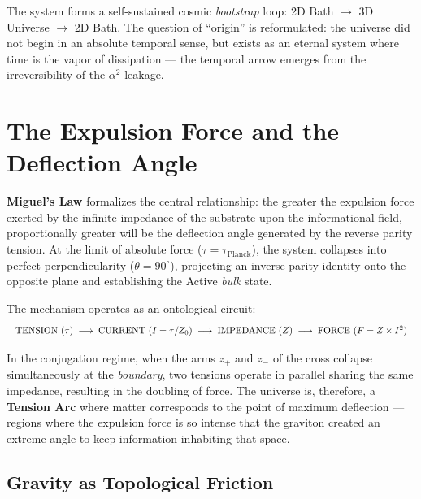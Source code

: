 \documentclass[12pt,a4paper,twoside]{article}
\newcommand{\alphaii}{\alpha^{2}}
\newcommand{\boundary}{\textit{boundary}}
\newcommand{\bulk}{\textit{bulk}}
\begin{document}
The system forms a self-sustained cosmic \textit{bootstrap} loop: 2D Bath $\to$ 3D Universe $\to$ 2D Bath. The question of ``origin'' is reformulated: the universe did not begin in an absolute temporal sense, but exists as an eternal system where time is the vapor of dissipation --- the temporal arrow emerges from the irreversibility of the $\alphaii$ leakage.


\section{The Expulsion Force and the Deflection Angle}


\textbf{Miguel's Law} formalizes the central relationship: the greater the expulsion force exerted by the infinite impedance of the substrate upon the informational field, proportionally greater will be the deflection angle generated by the reverse parity tension. At the limit of absolute force ($\tau = \tau_{\text{Planck}}$), the system collapses into perfect perpendicularity ($\theta = 90^\circ{}$), projecting an inverse parity identity onto the opposite plane and establishing the Active \bulk{} state.

The mechanism operates as an ontological circuit:
\begin{equation*}
\resizebox{\textwidth}{!}{%
$\text{TENSION } (\tau) \;\longrightarrow\; \text{CURRENT } (I = \tau/Z_0) \;\longrightarrow\; \text{IMPEDANCE } (Z) \;\longrightarrow\; \text{FORCE } (F = Z \times I^2)$%
}
\end{equation*}

In the conjugation regime, when the arms $z_+$ and $z_-$ of the cross collapse simultaneously at the \boundary, two tensions operate in parallel sharing the same impedance, resulting in the doubling of force. The universe is, therefore, a \textbf{Tension Arc} where matter corresponds to the point of maximum deflection --- regions where the expulsion force is so intense that the graviton created an extreme angle to keep information inhabiting that space.

\subsection{Gravity as Topological Friction}
\end{document}
